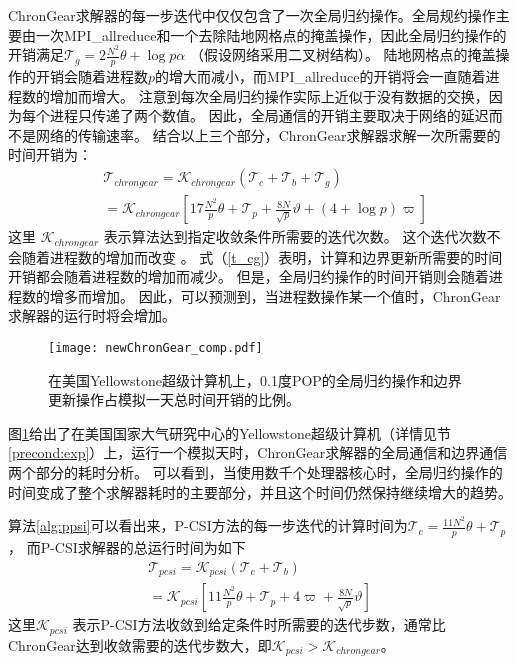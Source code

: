  
ChronGear求解器的每一步迭代中仅仅包含了一次全局归约操作。全局规约操作主要由一次MPI\_allreduce和一个去除陆地网格点的掩盖操作，因此全局归约操作的开销满足$\mathcal{T}_g= 2\frac{N^2}{p}\theta + \log p \alpha$ （假设网络采用二叉树结构）。 
陆地网格点的掩盖操作的开销会随着进程数$p$的增大而减小，而MPI\_allreduce的开销将会一直随着进程数的增加而增大。 
注意到每次全局归约操作实际上近似于没有数据的交换，因为每个进程只传递了两个数值。
因此，全局通信的开销主要取决于网络的延迟而不是网络的传输速率。
结合以上三个部分，ChronGear求解器求解一次所需要的时间开销为：
\begin{eqnarray}
\label{t_cg}
&\mathcal{T}_{chrongear}=\mathcal{K}_{chrongear} (\mathcal{T}_c + \mathcal{T}_b+\mathcal{T}_g )\nonumber \\
&=\mathcal{K}_{chrongear} [17 \frac{N^2}{p}\theta + \mathcal{T}_{p} +\frac{8N}{\sqrt{p}}\vartheta +(4+\log p)\varpi]
\end{eqnarray}
这里 $\mathcal{K}_{chrongear}$ 表示算法达到指定收敛条件所需要的迭代次数。
这个迭代次数不会随着进程数的增加而改变 \cite{hu2013scalable}。 
式（\ref{t_cg}）表明，计算和边界更新所需要的时间开销都会随着进程数的增加而减少。 
但是，全局归约操作的时间开销则会随着进程数的增多而增加。 
因此，可以预测到，当进程数操作某一个值时，ChronGear求解器的运行时将会增加。 

\begin{figure}[!t]
\begin{center}
	\texttt{[image: newChronGear\_comp.pdf]}
\caption[] {在美国Yellowstone超级计算机上，0.1度POP的全局归约操作和边界更新操作占模拟一天总时间开销的比例。}
\label{fig:ChronGearCOMP}
\end{center}
\end{figure}
 
图\ref{fig:ChronGearCOMP}给出了在美国国家大气研究中心的Yellowstone超级计算机（详情见节\ref{precond:exp}）上，运行一个模拟天时，ChronGear求解器的全局通信和边界通信两个部分的耗时分析。 
可以看到，当使用数千个处理器核心时，全局归约操作的时间变成了整个求解器耗时的主要部分，并且这个时间仍然保持继续增大的趋势。



算法\ref{alg:ppsi}可以看出来，P-CSI方法的每一步迭代的计算时间为$\mathcal{T}_c =\frac{11N^2}{p}\theta+\mathcal{T}_p$， 
而P-CSI求解器的总运行时间为如下
\begin{eqnarray}
\label{t_psi}
\mathcal{T}_{pcsi} = \mathcal{K}_{pcsi}(\mathcal{T}_c + \mathcal{T}_b ) \nonumber \\
= \mathcal{K}_{pcsi}[11\frac{N^2}{p}\theta+ \mathcal{T}_p +4\varpi + \frac{8N}{ \sqrt{p}}\vartheta]
\end{eqnarray}
这里$\mathcal{K}_{pcsi}$ 表示P-CSI方法收敛到给定条件时所需要的迭代步数，通常比ChronGear达到收敛需要的迭代步数大，即$\mathcal{K}_{pcsi}>\mathcal{K}_{chrongear}$。 



